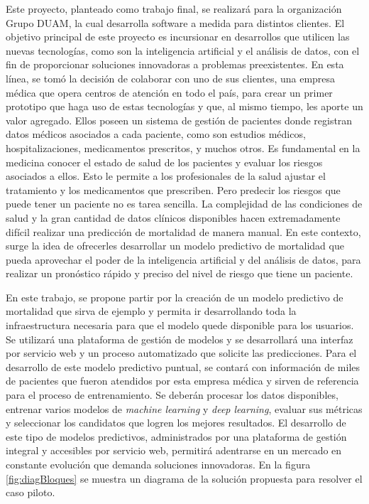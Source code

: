 \documentclass[
11pt, %
]{charter}
\begin{document}
Este proyecto, planteado como trabajo final, se realizará para la organización Grupo DUAM, la cual desarrolla software a medida para distintos clientes.
El objetivo principal de este proyecto es incursionar en desarrollos que utilicen las nuevas tecnologías, como son la inteligencia artificial y el análisis de datos, con el fin de proporcionar soluciones innovadoras a problemas preexistentes.
En esta línea, se tomó la decisión de colaborar con uno de sus clientes, una empresa médica que opera centros de atención en todo el país, para crear un primer prototipo que haga uso de estas tecnologías y que, al mismo tiempo, les aporte un valor agregado. Ellos poseen un sistema de gestión de pacientes donde registran datos médicos asociados a cada paciente, como son estudios médicos, hospitalizaciones, medicamentos prescritos, y muchos otros. Es fundamental en la medicina conocer el estado de salud de los pacientes y evaluar los riesgos asociados a ellos. Esto le permite a los profesionales de la salud ajustar el tratamiento y los medicamentos que  prescriben. Pero predecir los riesgos que puede tener un paciente no es tarea sencilla. La complejidad de las condiciones de salud y la gran cantidad de datos clínicos disponibles hacen extremadamente difícil realizar una predicción de mortalidad de manera manual.
En este contexto, surge la idea de ofrecerles desarrollar un modelo predictivo de mortalidad que pueda aprovechar el poder de la inteligencia artificial y del análisis de datos, para realizar un pronóstico rápido y preciso del nivel de riesgo que tiene un paciente.

En este trabajo, se propone partir por la creación de un modelo predictivo de mortalidad que sirva de ejemplo y permita ir desarrollando toda la infraestructura necesaria para que el modelo quede disponible para los usuarios. Se utilizará una plataforma de gestión de modelos y se desarrollará una interfaz por servicio web y un proceso automatizado que solicite las predicciones. Para el desarrollo de este modelo predictivo puntual, se contará con información de miles de pacientes que fueron atendidos por esta empresa médica y sirven de referencia para el proceso de entrenamiento. Se deberán procesar los datos disponibles, entrenar varios modelos de \textit{machine learning} y \textit{deep learning}, evaluar sus métricas y seleccionar los candidatos que logren los mejores resultados.
El desarrollo de este tipo de modelos predictivos, administrados por una plataforma de gestión integral y accesibles por servicio web, permitirá adentrarse en un mercado en constante evolución que demanda soluciones innovadoras. En la figura \ref{fig:diagBloques} se muestra un diagrama de la solución propuesta para resolver el caso piloto.
\end{document}
